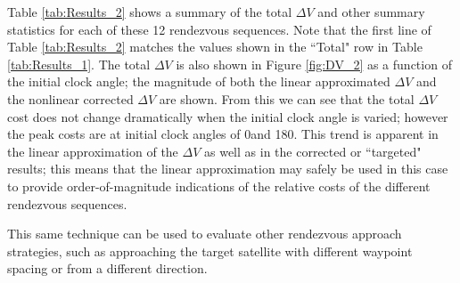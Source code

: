 \documentclass[a4paper]{article}
\begin{document}
Table \ref{tab:Results_2} shows a summary of the total \(\Delta V\) and other summary statistics for each of these 12 rendezvous sequences.  Note that the first line of Table \ref{tab:Results_2} matches the values shown in the ``Total" row in Table \ref{tab:Results_1}. The total \(\Delta V\) is also shown in Figure \ref{fig:DV_2} as a function of the initial clock angle; the magnitude of both the linear approximated \(\Delta V\) and the nonlinear corrected \(\Delta V\) are shown.  From this we can see that the total \(\Delta V\) cost does not change dramatically when the initial clock angle is varied; however the peak costs are at initial clock angles of 0\textdegree and 180\textdegree.  This trend is apparent in the linear approximation of the \(\Delta V\) as well as in the corrected or ``targeted" results; this means that the linear approximation may safely be used in this case to provide order-of-magnitude indications of the relative costs of the different rendezvous sequences.  

This same technique can be used to evaluate other rendezvous approach strategies, such as approaching the target satellite with different waypoint spacing or from a different direction.
\end{document}
